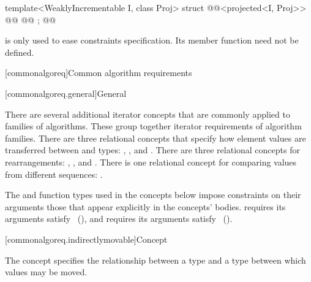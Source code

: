 \begin{addedblock}
\begin{codeblock}
  template<WeaklyIncrementable I, class Proj>
  struct @@<projected<I, Proj>> {
    @@
    @@
  };
@\newtxt{\}}@
\end{codeblock}

\pnum
\begin{note}
 is only used to ease constraints specification. Its
member function need not be defined.
\end{note}

[commonalgoreq]{Common algorithm requirements}

[commonalgoreq.general]{General}

\pnum
There are several additional iterator concepts that are commonly applied to families of algorithms.
These group together iterator requirements of algorithm families. There are three relational
concepts that specify how element values are transferred between  and  types:
, , and . There are three relational concepts
for rearrangements: , , and .
There is one relational concept for comparing values from different sequences: .

\pnum
\begin{note}
The  and  function  types used in the
concepts below impose  constraints on their arguments 
 those that appear explicitly in the
concepts' bodies.  requires its arguments satisfy ~(),
and  requires its arguments satisfy ~().
\end{note}

[commonalgoreq.indirectlymovable]{Concept }

\pnum
The  concept specifies the relationship between a 
type and a  type between which values may be moved.


\end{addedblock}
